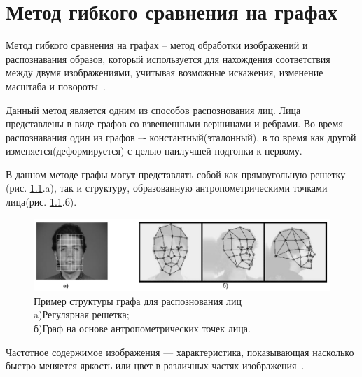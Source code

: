 \chapter{Метод гибкого сравнения на графах}

Метод гибкого сравнения на графах -- метод обработки изображений и распознавания образов, который 
используется для нахождения соответствия между двумя изображениями, учитывая возможные искажения, изменение масштаба и повороты~\cite{distances}.

Данный метод является одним из способов распознования лиц.
Лица представлены в виде графов со взвешенными
вершинами и ребрами\cite{wen}. 
Во время распознавания один из графов –- константный(эталонный), 
в то время как другой изменяется(деформируется) с 
целью наилучшей подгонки к первому. 

В данном методе графы могут представлять собой как 
прямоугольную решетку (рис. \ref{img:ant}.a), так и структуру, образованную антропометрическими
точками лица(рис. \ref{img:ant}.б).

\begin{figure}[h]
    \centering
    \includegraphics[height=0.15\textheight]{img/ex.jpg}
    \caption{Пример структуры графа для распознования лиц \\ 
    a)Регулярная решетка; \\ б)Граф на основе антропометрических точек лица.}
    \label{img:ant}
\end{figure}

Частотное содержимое изображения --- характеристика, показывающая насколько быстро 
меняется яркость или цвет в различных частях изображения~\cite{chst}.

